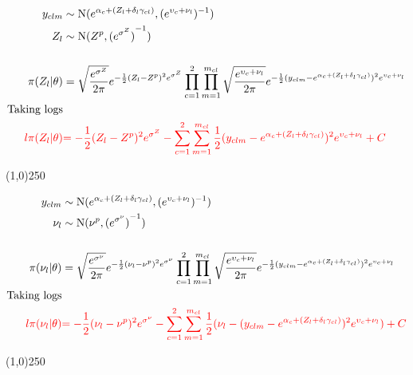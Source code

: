 \begin{align*}
y_{clm} &\sim \operatorname{N}(e^{\alpha_{c}+(Z_{l}+\delta_{l}\gamma_{cl})},(e^{ \upsilon_{c}+\nu_{l} })^{-1})\\
Z_{l} &\sim \operatorname{N}(Z^{p},{(e^{\sigma^{Z}})}^{-1})\\
\\
\pi(Z_{l}|\theta)&=\sqrt{\frac{e^{\sigma^{Z}}}{2\pi}} e^{-\frac{1}{2}(Z_{l}-Z^{p})^{2}e^{\sigma^{Z}} }
\prod_{c=1}^{2}\prod_{m=1}^{m_{cl}}\sqrt{\frac{e^{ \upsilon_{c}+\nu_{l} }}{2\pi}} e^{-\frac{1}{2}(y_{clm}-e^{\alpha_{c}+(Z_{l}+\delta_{l}\gamma_{cl})})^{2}e^{ \upsilon_{c}+\nu_{l} } }\\
\text{Taking logs}\\
\color{red}{l\pi(Z_{l}|\theta)}&
\color{red}{
=-\frac{1}{2}(Z_{l}-Z^{p})^{2}e^{\sigma^{Z}}
-
\sum_{c=1}^{2}\sum_{m=1}^{m_{cl}}\frac{1}{2}(y_{clm}-e^{\alpha_{c}+(Z_{l}+\delta_{l}\gamma_{cl})})^{2}e^{\upsilon_{c}+\nu_{l}}
+C
}
\end{align*}

\begin{center}
\line(1,0){250}
\end{center}

\begin{align*}
y_{clm} &\sim \operatorname{N}(e^{\alpha_{c}+(Z_{l}+\delta_{l}\gamma_{cl})},(e^{ \upsilon_{c}+\nu_{l} })^{-1})\\
\nu_{l} &\sim \operatorname{N}(\nu^p,{ (e^{{\sigma}^{\nu}} )}^{-1} )\\
\\
\pi(\nu_{l}|\theta)&=\sqrt{\frac{e^{{\sigma}^{\nu}}}{2\pi}} e^{-\frac{1}{2}(\nu_{l}-\nu^{p})^{2}e^{{\sigma}^{\nu}} }
\prod_{c=1}^{2}\prod_{m=1}^{m_{cl}}\sqrt{\frac{e^{ \upsilon_{c}+\nu_{l} }}{2\pi}} e^{-\frac{1}{2}(y_{clm}-e^{\alpha_{c}+(Z_{l}+\delta_{l}\gamma_{cl})})^{2}e^{ \upsilon_{c}+\nu_{l} } }\\
\text{Taking logs}\\
\color{red}{l\pi(\nu_{l}|\theta)}&
\color{red}{
=-\frac{1}{2}(\nu_{l}-\nu^{p})^{2}e^{\sigma^{\nu}}
-
\sum_{c=1}^{2}\sum_{m=1}^{m_{cl}}\frac{1}{2}(\nu_{l} -(y_{clm}-e^{\alpha_{c}+(Z_{l}+\delta_{l}\gamma_{cl})})^{2}e^{\upsilon_{c}+\nu_{l}})
+C
}
\end{align*}


\begin{center}
\line(1,0){250}
\end{center}

